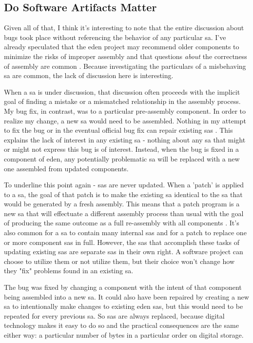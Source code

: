\documentclass[a4paper,man,natbib,floatsintext]{apa6}
\begin{document}
   \subsection*{Do Software Artifacts Matter}
   Given all of that, I think it's interesting to note that the entire discussion about bugs took place without referencing the behavior of any particular \gls{sa}. I've already speculated that the \acrshort{eden} project may recommend older components to minimize the risks of improper assembly and that questions \textit{about} the correctness of assembly are common \citep{Trendspotter2020-ps}. Because investigating the particulars of a misbehaving \gls{sa} are common, the lack of discussion here is interesting. 

   When a \gls{sa} is under discussion, that discussion often proceeds with the implicit goal of finding a mistake or a mismatched relationship in the assembly process. My bug fix, in contrast, was to a particular pre-assembly component. In order to realize my change, a new \gls{sa} would need to be assembled. Nothing in my attempt to fix the bug or in the eventual official bug fix can repair existing \glspl{sa} \citep{Konig2020-yx,Konig2020-ey}. This explains the lack of interest in any existing \gls{sa} - nothing about any \gls{sa} that might or might not express this bug is of interest. Instead, when the bug is fixed in a component of \acrshort{eden}, any potentially problematic \gls{sa} will be replaced with a new one assembled from updated components.

   To underline this point again - \glspl{sa} are never updated. When a 'patch' is applied to a \gls{sa}, the goal of that patch is to make the existing \gls{sa} identical to the \gls{sa} that would be generated by a fresh assembly. This means that a patch program is a new \gls{sa} that will effectuate a different assembly process than usual with the goal of producing the same outcome as a full re-assembly with all components \citep{Endsley_undated-iy}. It's also common for a \gls{sa} to contain many internal \glspl{sa} and for a patch to replace one or more component \glspl{sa} in full. However, the \glspl{sa} that accomplish these tasks of updating existing \glspl{sa} are separate \glspl{sa} in their own right. A software project can choose to utilize them or not utilize them, but their choice won't change how they "fix" problems found in an existing \gls{sa}. 

   The bug was fixed by changing a component with the intent of that component being assembled into a new \gls{sa}. It could also have been repaired by creating a new \gls{sa} to intentionally make changes to existing \acrshort{eden} \glspl{sa}, but this would need to be repeated for every previous \gls{sa}. So \glspl{sa} are always replaced, because digital technology makes it easy to do so and the practical consequences are the same either way: a particular number of bytes in a particular order on digital storage. 
\end{document}
